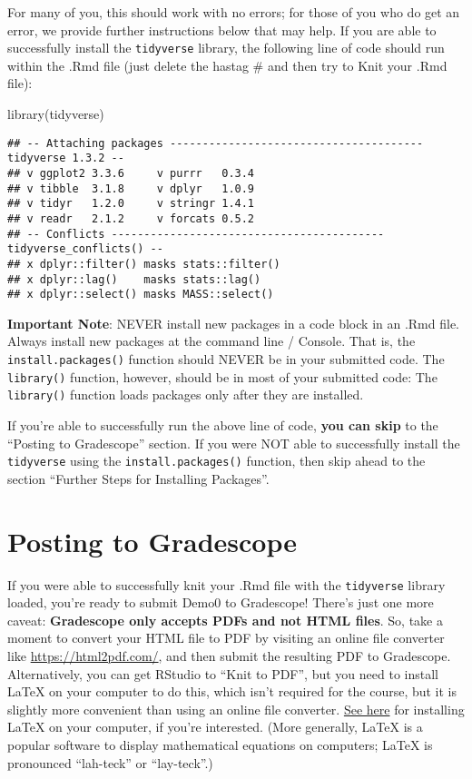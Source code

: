 \documentclass[
]{article}
\newenvironment{Shaded}{\begin{snugshade}}{\end{snugshade}}
\newcommand{\FunctionTok}[1]{\textcolor[rgb]{0.00,0.00,0.00}{#1}}
\newcommand{\NormalTok}[1]{#1}
\begin{document}
For many of you, this should work with no errors; for those of you who
do get an error, we provide further instructions below that may help. If
you are able to successfully install the \texttt{tidyverse} library, the
following line of code should run within the .Rmd file (just delete the
hastag \# and then try to Knit your .Rmd file):

\begin{Shaded}
\begin{Highlighting}[]
\FunctionTok{library}\NormalTok{(tidyverse)}
\end{Highlighting}
\end{Shaded}

\begin{verbatim}
## -- Attaching packages --------------------------------------- tidyverse 1.3.2 --
## v ggplot2 3.3.6     v purrr   0.3.4
## v tibble  3.1.8     v dplyr   1.0.9
## v tidyr   1.2.0     v stringr 1.4.1
## v readr   2.1.2     v forcats 0.5.2
## -- Conflicts ------------------------------------------ tidyverse_conflicts() --
## x dplyr::filter() masks stats::filter()
## x dplyr::lag()    masks stats::lag()
## x dplyr::select() masks MASS::select()
\end{verbatim}

\textbf{Important Note}: NEVER install new packages in a code block in
an .Rmd file. Always install new packages at the command line / Console.
That is, the \texttt{install.packages()} function should NEVER be in
your submitted code. The \texttt{library()} function, however, should be
in most of your submitted code: The \texttt{library()} function loads
packages only after they are installed.

If you're able to successfully run the above line of code, \textbf{you
can skip} to the ``Posting to Gradescope'' section. If you were NOT able
to successfully install the \texttt{tidyverse} using the
\texttt{install.packages()} function, then skip ahead to the section
``Further Steps for Installing Packages''.

\hypertarget{posting-to-gradescope}{%
\section{Posting to Gradescope}\label{posting-to-gradescope}}

If you were able to successfully knit your .Rmd file with the
\texttt{tidyverse} library loaded, you're ready to submit Demo0 to
Gradescope! There's just one more caveat: \textbf{Gradescope only
accepts PDFs and not HTML files}. So, take a moment to convert your HTML
file to PDF by visiting an online file converter like
\url{https://html2pdf.com/}, and then submit the resulting PDF to
Gradescope. Alternatively, you can get RStudio to ``Knit to PDF'', but
you need to install LaTeX on your computer to do this, which isn't
required for the course, but it is slightly more convenient than using
an online file converter. \href{https://www.latex-project.org/get/}{See
here} for installing LaTeX on your computer, if you're interested. (More
generally, LaTeX is a popular software to display mathematical equations
on computers; LaTeX is pronounced ``lah-teck'' or ``lay-teck''.)
\end{document}

